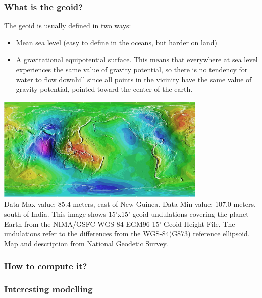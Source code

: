 
\subsubsection{What is the geoid?}


The geoid is usually defined in two ways:
\begin{itemize}
\item Mean sea level (easy to define in the oceans, but harder on land)
\item A gravitational equipotential surface. This means that everywhere at sea level experiences the same value of gravity potential, so there is no tendency for water to flow downhill since all points in the vicinity have the same value of gravity potential, pointed toward the center of the earth.
\end{itemize}

\begin{center}
\includegraphics[width=10cm]{images/geoid/ww15mgh}\\
{\captionfont Data Max value: 85.4 meters, east of New Guinea. Data Min value:-107.0 meters, south of India. 
This image shows 15'x15' geoid undulations covering the planet Earth from the NIMA/GSFC WGS-84 EGM96 15' Geoid Height File. The undulations refer to the differences from the WGS-84(G873) reference ellipsoid. Map and description from National Geodetic Survey.}
\end{center}


\subsubsection{How to compute it?}

\subsubsection{Interesting modelling}

